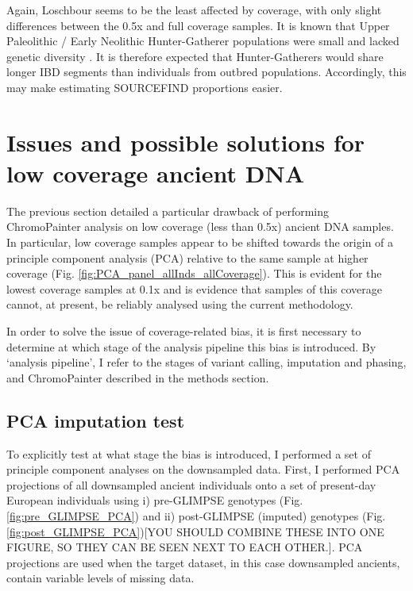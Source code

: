 Again, Loschbour seems to be the least affected by coverage, with only slight differences between the 0.5x and full coverage samples. It is known that Upper Paleolithic / Early Neolithic Hunter-Gatherer populations were small and lacked genetic diversity \cite{excoffier1999hunter, Lazaridis2014, Fu2016}. It is therefore expected that Hunter-Gatherers would share longer IBD segments than individuals from outbred populations. Accordingly, this may make estimating SOURCEFIND proportions easier.


\section{Issues and possible solutions for low coverage ancient DNA}

The previous section detailed a particular drawback of performing ChromoPainter analysis on low coverage (less than 0.5x) ancient DNA samples. In particular, low coverage samples appear to be shifted towards the origin of a principle component analysis (PCA) relative to the same sample at higher coverage (Fig. \ref{fig:PCA_panel_allInds_allCoverage}). This is evident for the lowest coverage samples at 0.1x and is evidence that samples of this coverage cannot, at present, be reliably analysed using the current methodology.

In order to solve the issue of coverage-related bias, it is first necessary to determine at which stage of the analysis pipeline this bias is introduced. By `analysis pipeline', I refer to the stages of variant calling, imputation and phasing, and ChromoPainter described in the methods section.

\subsection{PCA imputation test}

To explicitly test at what stage the bias is introduced, I performed a set of principle component analyses on the downsampled data. First, I performed PCA projections of all downsampled ancient individuals onto a set of present-day European individuals using i) pre-GLIMPSE genotypes (Fig. \ref{fig:pre_GLIMPSE_PCA}) and ii) post-GLIMPSE (imputed) genotypes (Fig. \ref{fig:post_GLIMPSE_PCA}){\color{red}[YOU SHOULD COMBINE THESE INTO ONE FIGURE, SO THEY CAN BE SEEN NEXT TO EACH OTHER.]}. PCA projections are used when the target dataset, in this case downsampled ancients, contain variable levels of missing data.  

